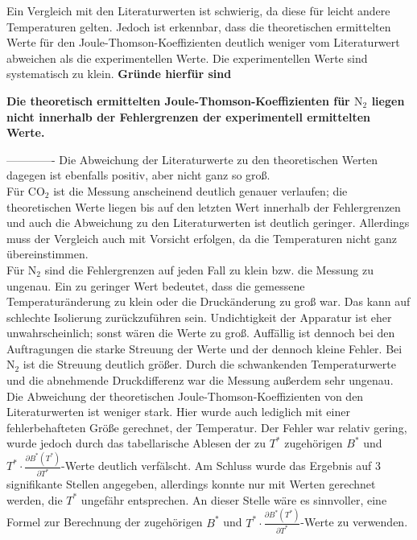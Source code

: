 \documentclass[a4paper,12pt,oneside,onecolum,final,openany]{report}
\begin{document}
Ein Vergleich mit den Literaturwerten ist schwierig, da diese für leicht andere Temperaturen gelten. Jedoch ist erkennbar, dass die theoretischen ermittelten Werte für den Joule-Thomson-Koeffizienten deutlich weniger vom Literaturwert abweichen als die experimentellen Werte.
Die experimentellen Werte sind systematisch zu klein.
\textbf{Gründe hierfür sind}

\textbf{Die theoretisch ermittelten Joule-Thomson-Koeffizienten für $\mathrm{N}_2$ liegen nicht innerhalb der Fehlergrenzen der experimentell ermittelten Werte.}





-------------
Die Abweichung der Literaturwerte zu den theoretischen Werten dagegen ist ebenfalls positiv, aber nicht ganz so groß. \\

Für $\mathrm{CO}_2$ ist die Messung anscheinend deutlich genauer verlaufen; die theoretischen Werte liegen bis auf den letzten Wert innerhalb der Fehlergrenzen und auch die Abweichung zu den Literaturwerten ist deutlich geringer. Allerdings muss der Vergleich auch mit Vorsicht erfolgen, da die Temperaturen nicht ganz übereinstimmen.\\

Für $\mathrm{N}_2$ sind die Fehlergrenzen auf jeden Fall zu klein bzw. die Messung zu ungenau. Ein zu geringer Wert bedeutet, dass die gemessene Temperaturänderung zu klein oder die Druckänderung zu groß war. Das kann auf schlechte Isolierung zurückzuführen sein. Undichtigkeit der Apparatur ist eher unwahrscheinlich; sonst wären die Werte zu groß. Auffällig ist dennoch bei den Auftragungen die starke Streuung der Werte und der dennoch kleine Fehler. Bei $\mathrm{N}_2$ ist die Streuung deutlich größer. Durch die schwankenden Temperaturwerte und die abnehmende Druckdifferenz war die Messung außerdem sehr ungenau.\\
  
Die Abweichung der theoretischen Joule-Thomson-Koeffizienten von den Literaturwerten ist weniger stark. Hier wurde auch lediglich mit einer fehlerbehafteten Größe gerechnet, der Temperatur. Der Fehler war relativ gering, wurde jedoch durch das tabellarische Ablesen der zu $T^*$ zugehörigen $B^*$ und $T^* \cdot \frac{\partial B^*(T^*)}{\partial T^*}$-Werte deutlich verfälscht. Am Schluss wurde das Ergebnis auf 3 signifikante Stellen angegeben, allerdings konnte nur mit Werten gerechnet werden, die $T^*$ ungefähr entsprechen. An dieser Stelle wäre es sinnvoller, eine Formel zur Berechnung der zugehörigen $B^*$ und $T^* \cdot \frac{\partial B^*(T^*)}{\partial T^*}$-Werte zu verwenden.\\
\end{document}
